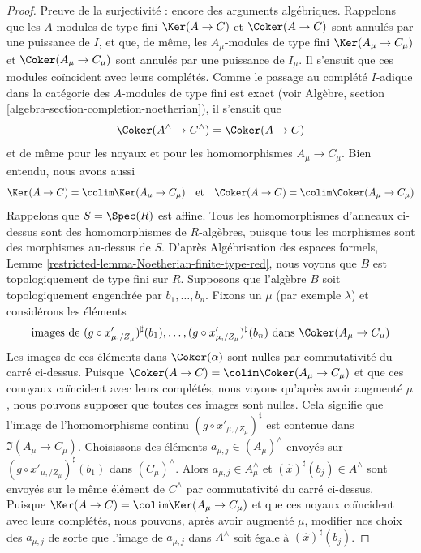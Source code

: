 \begin{proof}
\medskip\noindent
Preuve de la surjectivité : encore des arguments algébriques. Rappelons que les
$A$-modules de type fini $\Ker(A \to C)$ et $\Coker(A \to C)$ sont annulés
par une puissance de $I$, et que, de même, les $A_\mu$-modules de type fini
$\Ker(A_\mu \to C_\mu)$ et $\Coker(A_\mu \to C_\mu)$ sont annulés
par une puissance de $I_\mu$. Il s'ensuit que ces modules
coïncident avec leurs complétés. Comme le passage au complété $I$-adique dans la catégorie des
$A$-modules de type fini est exact (voir
Algèbre, section \ref{algebra-section-completion-noetherian}),
il s'ensuit que
$$
\Coker(A^\wedge \to C^\wedge) = \Coker(A \to C)
$$
et de même pour les noyaux et pour les homomorphismes $A_\mu \to C_\mu$.
Bien entendu, nous avons aussi
$$
\Ker(A \to C) = \colim \Ker(A_\mu \to C_\mu)
\quad\text{et}\quad
\Coker(A \to C) = \colim \Coker(A_\mu \to C_\mu)
$$
Rappelons que $S = \Spec(R)$ est affine. Tous les homomorphismes d'anneaux
ci-dessus sont des homomorphismes de $R$-algèbres, puisque tous les morphismes
sont des morphismes au-dessus de $S$. D'après
Algébrisation des espaces formels, Lemme
\ref{restricted-lemma-Noetherian-finite-type-red},
nous voyons que $B$ est topologiquement de type fini sur $R$.
Supposons que l'algèbre $B$ soit topologiquement engendrée par $b_1, \ldots, b_n$.
Fixons un $\mu$ (par exemple $\lambda$) et considérons
les éléments
$$
\text{images de }
(g \circ x'_{\mu, /Z_\mu})^\sharp(b_1)
, \ldots,
(g \circ x'_{\mu, /Z_\mu})^\sharp(b_n)
\text{ dans }\Coker(A_\mu \to C_\mu)
$$
Les images de ces éléments dans $\Coker(\alpha)$ sont nulles
par commutativité du carré ci-dessus. Puisque
$\Coker(A \to C) = \colim \Coker(A_\mu \to C_\mu)$ et que ces
conoyaux coïncident avec leurs complétés,
nous voyons qu'après avoir augmenté $\mu$, nous pouvons supposer que toutes ces
images sont nulles. Cela signifie que l'image de l'homomorphisme continu
$(g \circ x'_{\mu, /Z_\mu})^\sharp$ est contenue
dans $\Im(A_\mu \to C_\mu)$.
Choisissons des éléments $a_{\mu, j} \in (A_\mu)^\wedge$ envoyés sur
$(g \circ x'_{\mu, /Z_\mu})^\sharp(b_1)$ dans $(C_\mu)^\wedge$.
Alors $a_{\mu, j} \in A_\mu^\wedge$ et $(\hat x)^\sharp(b_j) \in A^\wedge$
sont envoyés sur le même élément de $C^\wedge$ par commutativité du
carré ci-dessus. Puisque
$\Ker(A \to C) = \colim \Ker(A_\mu \to C_\mu)$ et que ces noyaux
coïncident avec leurs complétés, nous pouvons, après avoir augmenté
$\mu$, modifier nos choix des $a_{\mu, j}$ de sorte que
l'image de $a_{\mu, j}$ dans $A^\wedge$ soit égale à $(\hat x)^\sharp(b_j)$.


\end{proof}
